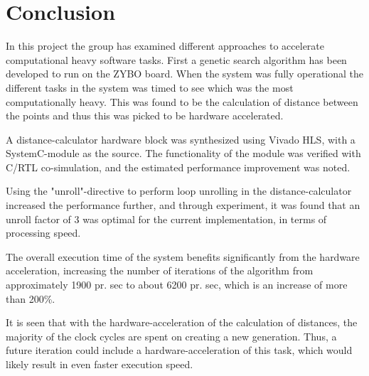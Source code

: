 
\chapter{Conclusion}
In this project the group has examined different approaches to accelerate computational heavy software tasks. First a genetic search algorithm has been developed to run on the ZYBO board. When the system was fully operational the different tasks in the system was timed to see which was the most computationally heavy. This was found to be the calculation of distance between the points and thus this was picked to be hardware accelerated. 

A distance-calculator hardware block was synthesized using Vivado HLS, with a SystemC-module as the source. The functionality of the module was verified with C/RTL co-simulation, and the estimated performance improvement was noted.

Using the "unroll"-directive to perform loop unrolling in the distance-calculator increased the performance further, and through experiment, it was found that an unroll factor of 3 was optimal for the current implementation, in terms of processing speed.

The overall execution time of the system benefits significantly from the hardware acceleration, increasing the number of iterations of the algorithm from approximately 1900 pr. sec to about 6200 pr. sec, which is an increase of more than 200\%.

It is seen that with the hardware-acceleration of the calculation of distances, the majority of the clock cycles are spent on creating a new generation. Thus, a future iteration could include a hardware-acceleration of this task, which would likely result in even faster execution speed.

